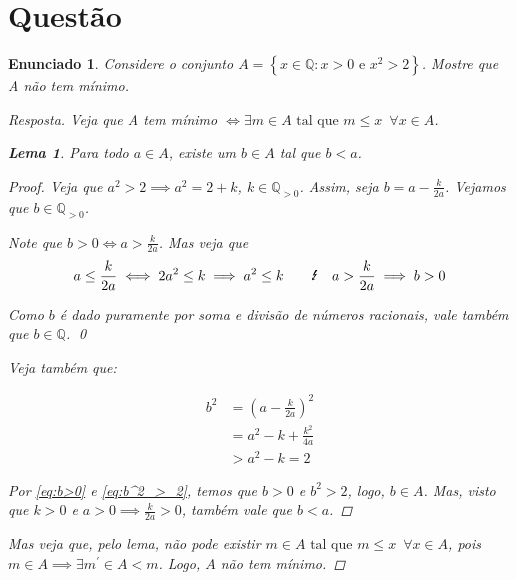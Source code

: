 \documentclass[a4paper,twoside,11pt]{article}
\newtheorem*{enunciado}{Enunciado}
\newtheorem*{lemma}{Lema}
\begin{document}
\section{Questão}
\begin{enunciado}
    Considere o conjunto $A = \left\{ x \in \mathbb{Q} : x > 0 \text{ e } x^2 > 2 \right\}$.
    Mostre que A não tem mínimo.

    \begin{proof}[Resposta]
        Veja que A tem mínimo $\iff \exists m \in A \text{ tal que } m \leq x \enspace \forall x \in A$.

        \begin{lemma}
            Para todo $a \in A$, existe um $b \in A$ tal que $b < a$.

            \begin{proof}
                Veja que $a^2 > 2 \implies a^2 = 2 + k$, $k \in \mathbb{Q}_{>0}$.
                Assim, seja $b = a - \frac{k}{2a}$. Vejamos que $b \in \mathbb{Q}_{>0}$.
                
                Note que $b > 0 \iff a > \frac{k}{2a}$. Mas veja que
                \begin{equation} \label{eq:b>0}
                    \begin{split}
                         a \leq \frac{k}{2a} \iff 2a^2 \leq k \implies a^2 \leq k \text
                         \qquad \text{\Lightning} \quad a > \frac{k}{2a} \implies b > 0
                    \end{split}
                \end{equation}
                
                Como $b$ é dado puramente por soma e divisão de números racionais, vale também que
                $b \in \mathbb{Q}$. \qed

                Veja também que:

                \begin{equation} \label{eq:b^2_>_2}
                    \begin{split}
                        b^2 &= (a - \frac{k}{2a})^2 \\
                            &= a^2 - k + \frac{k^2}{4a} \\
                            &> a^2 - k = 2
                    \end{split}
                \end{equation}

                Por \ref{eq:b>0} e \ref{eq:b^2_>_2}, temos que $b > 0$ e $b^2 > 2$, logo,
                $b \in A$. Mas, visto que $k > 0$ e $a > 0 \implies \frac{k}{2a} > 0$,
                também vale que $b < a$. \qedhere
            \end{proof}
        \end{lemma}

        Mas veja que, pelo lema, não pode existir
        $m \in A \text{ tal que } m \leq x \enspace \forall x \in A $, pois
        $m \in A \implies \exists m^{\prime} \in A < m$. Logo, $A$ não tem mínimo.
    \end{proof}
\end{enunciado}
\end{document}
